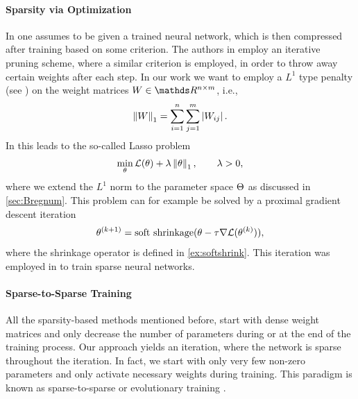 \paragraph{Sparsity via Optimization} In \cite{lecun1989optimal, hassibi1993optimal} one assumes to be given a trained neural network, which is then compressed after training based on some criterion. The authors in \cite{castellano1997iterative} employ an iterative pruning scheme, where a similar criterion is employed, in order to throw away certain weights after each step. In our work we want to employ a $L^1$ type penalty (see \cite{claerbout1973robust}) on the weight matrices $W\in\R^{n\times m}$, i.e.,
%
\begin{align*}
\left\|W\right\|_1 = \sum_{i=1}^n\sum_{j=1}^m \left|W_{ij}\right|.
\end{align*}
%
In \cite{tibshirani1996regression} this leads to the so-called Lasso problem
%
\begin{align*}
\min_\theta \mathcal{L}(\theta) + \lambda \left\|\theta\right\|_1,\qquad \lambda >0,
\end{align*}
%
where we extend the $L^1$ norm to the parameter space $\Theta$ as discussed in \cref{sec:Bregnum}. This problem can for example be solved by a proximal gradient descent iteration
%
\begin{align}\label{eq:proxgd}
\theta^{(k+1)} = \operatorname{soft\ shrinkage}(\theta - \tau \nabla\mathcal{L}(\theta^{(k)})),
\end{align}
%
where the shrinkage operator is defined in \cref{ex:softshrink}. This iteration was employed in \cite{nitanda2014stochastic, rosasco2014convergence, reddi2016proximal} to train sparse neural networks.
%
%
\paragraph{Sparse-to-Sparse Training} All the sparsity-based methods mentioned before, start with dense weight matrices and only decrease the number of parameters during or at the end of the training process. Our approach yields an iteration, where the network is sparse throughout the iteration. In fact, we start with only very few non-zero parameters and only activate necessary weights during training. This paradigm is known as sparse-to-sparse or evolutionary training \cite{mocanu2018scalable, dettmers2019sparse, Evci2020, dai2019nest, fu2019exploring, huang2016split, liu2021}.
%
%
